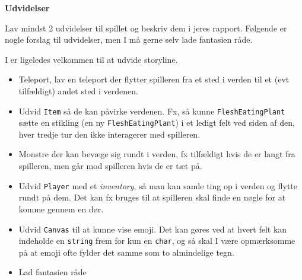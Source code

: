 \textbf{Udvidelser}

Lav mindst 2 udvidelser til spillet og beskriv dem i jeres
rapport. Følgende er nogle forslag til udvidelser, men I må gerne selv lade
fantasien råde.

I er ligeledes velkommen til at udvide storyline.

\begin{itemize}
\item Teleport, lav en teleport der flytter spilleren fra et sted i
  verden til et (evt tilfældigt) andet sted i verdenen.
\item Udvid \lstinline{Item} så de kan påvirke verdenen. Fx, så kunne
  \lstinline{FleshEatingPlant} sætte en stikling (en ny
  \lstinline{FleshEatingPlant}) i et ledigt felt ved
  siden af den, hver tredje tur den ikke interagerer med spilleren.
\item Monstre der kan bevæge sig rundt i verden, fx tilfældigt hvis de
  er langt fra spilleren, men går mod spilleren hvis de er tæt på.
\item Udvid \lstinline{Player} med et \emph{inventory}, så man kan samle ting op i
  verden og flytte rundt på dem. Det kan fx bruges til at spilleren
  skal finde en nøgle for at komme gennem en dør.
\item Udvid \lstinline{Canvas} til at kunne vise emoji. Det kan gøres ved at
  hvert felt kan indeholde en \lstinline{string} frem for kun en \lstinline{char}, og så
  skal I være opmærksomme på at emoji ofte fylder det samme som to
  almindelige tegn.
\item Lad fantasien råde
\end{itemize}

